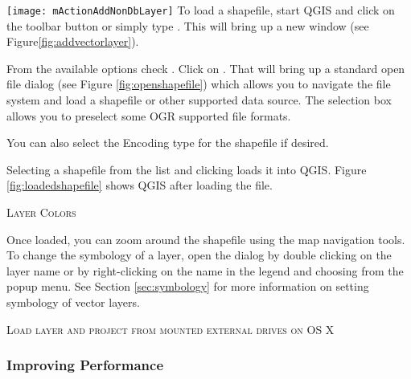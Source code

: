 \texttt{[image: mActionAddNonDbLayer]} To load a shapefile, start
QGIS and click on the 
toolbar button or simply type . 
This will bring up a new window (see Figure\ref{fig:addvectorlayer}).  

From the available options check . Click on . 
That will bring up a standard open file dialog (see Figure
\ref{fig:openshapefile}) which allows you to navigate the file system and load
a shapefile or other supported data source. 
The selection box  allows you to preselect some OGR supported file formats.

You can also select the Encoding type for the shapefile if desired.

Selecting a shapefile from the list and clicking  loads it into QGIS. Figure
\ref{fig:loadedshapefile} shows QGIS after loading the  file.


\begin{Tip}\caption{\textsc{Layer Colors}}
\end{Tip}

Once loaded, you can zoom around the shapefile using the map navigation tools.
To change the symbology of a layer, open the  dialog by double
clicking on the layer name or by right-clicking on the name in the legend and
choosing  from the popup menu. See
Section \ref{sec:symbology} for more information on setting symbology of
vector layers.
 
\begin{Tip}\caption{\textsc{Load layer and project from mounted external
drives on OS X}}
\end{Tip}
 
\subsubsection{Improving Performance}


